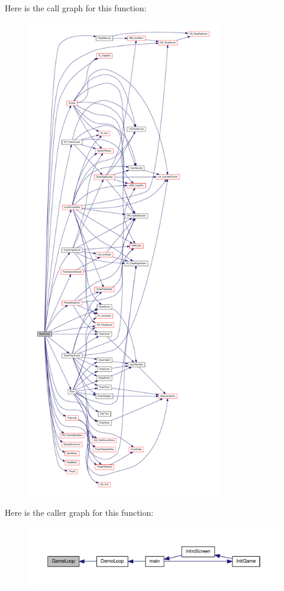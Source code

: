 Here is the call graph for this function:
\nopagebreak
\begin{figure}[H]
\begin{center}
\leavevmode
\includegraphics[height=600pt]{WL__DEF_8H_aceb580a0e9c038f9f4a99672883b287a_cgraph}
\end{center}
\end{figure}




Here is the caller graph for this function:
\nopagebreak
\begin{figure}[H]
\begin{center}
\leavevmode
\includegraphics[width=400pt]{WL__DEF_8H_aceb580a0e9c038f9f4a99672883b287a_icgraph}
\end{center}
\end{figure}


